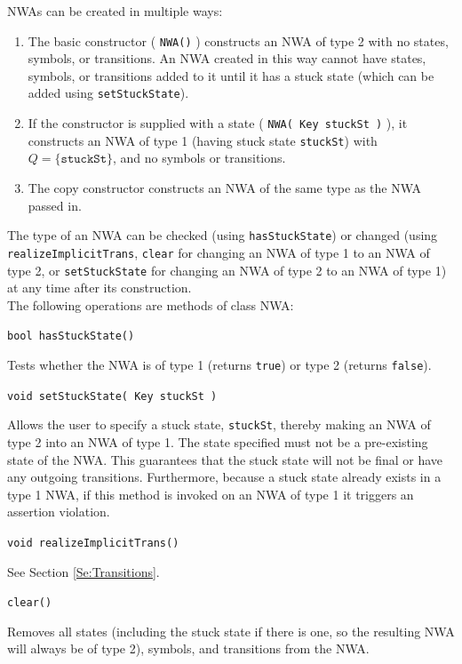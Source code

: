 \documentclass{llncs}
\begin{document}
NWAs can be created in multiple ways: 
\begin{enumerate}
  \item The basic constructor ( \texttt{NWA()} ) constructs an NWA of type 2 with no states, symbols, or transitions.  An NWA created in this way cannot have states, symbols, or transitions added to it until it has a stuck state (which can be added using \texttt{setStuckState}).

  \item If the constructor is supplied with a state ( \texttt{NWA( Key stuckSt )} ), it constructs an NWA of type 1 (having stuck state \texttt{stuckSt}) with $Q = \{\texttt{stuckSt}\}$, and no symbols or transitions.

  \item The copy constructor constructs an NWA of the same type as the NWA passed in.
\end{enumerate} 
\noindent The type of an NWA can be checked (using \texttt{hasStuckState}) or changed (using \texttt{realizeImplicitTrans}, \texttt{clear} for changing an NWA of type 1 to an NWA of type 2, or \texttt{setStuckState} for changing an NWA of type 2 to an NWA of type 1) at any time after its construction. \\

\noindent The following operations are methods of class NWA:

\begin{description}

  \item \texttt{bool hasStuckState()}

    Tests whether the NWA is of type 1 (returns \texttt{true}) or type 2 (returns \texttt{false}).

  \item \texttt{void setStuckState( Key stuckSt )}


    Allows the user to specify a stuck state, \texttt{stuckSt}, thereby making an NWA of type 2 into an NWA of type 1.  The state specified must not be a pre-existing state of the NWA.  This guarantees that the stuck state will not be final or have any outgoing transitions.  Furthermore, because a stuck state already exists in a type 1 NWA, if this method is invoked on an NWA of type 1 it triggers an assertion violation. 


  \item \texttt{void realizeImplicitTrans()}

    See Section \ref{Se:Transitions}.

  \item \texttt{clear()}

    Removes all states (including the stuck state if there is one, so the resulting NWA will always be of type 2), symbols, and transitions from the NWA. \\ 

\end{description}
\end{document}
